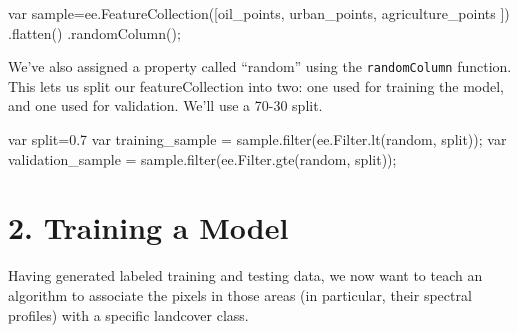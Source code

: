 \documentclass[
  letterpaper,
  DIV=11,
  numbers=noendperiod]{scrreprt}
\newenvironment{Shaded}{\begin{snugshade}}{\end{snugshade}}
\newcommand{\AttributeTok}[1]{\textcolor[rgb]{0.40,0.45,0.13}{#1}}
\newcommand{\FloatTok}[1]{\textcolor[rgb]{0.68,0.00,0.00}{#1}}
\newcommand{\FunctionTok}[1]{\textcolor[rgb]{0.28,0.35,0.67}{#1}}
\newcommand{\KeywordTok}[1]{\textcolor[rgb]{0.00,0.23,0.31}{#1}}
\newcommand{\NormalTok}[1]{\textcolor[rgb]{0.00,0.23,0.31}{#1}}
\newcommand{\OperatorTok}[1]{\textcolor[rgb]{0.37,0.37,0.37}{#1}}
\newcommand{\StringTok}[1]{\textcolor[rgb]{0.13,0.47,0.30}{#1}}
\begin{document}
\begin{Shaded}
\begin{Highlighting}[]
\KeywordTok{var}\NormalTok{ sample}\OperatorTok{=}\NormalTok{ee}\OperatorTok{.}\FunctionTok{FeatureCollection}\NormalTok{([oil\_points}\OperatorTok{,}
\NormalTok{                                  urban\_points}\OperatorTok{,}
\NormalTok{                                  agriculture\_points}
\NormalTok{                                  ])}
                                  \OperatorTok{.}\FunctionTok{flatten}\NormalTok{()}
                                  \OperatorTok{.}\FunctionTok{randomColumn}\NormalTok{()}\OperatorTok{;}
\end{Highlighting}
\end{Shaded}

We've also assigned a property called ``random'' using the
\texttt{randomColumn} function. This lets us split our featureCollection
into two: one used for training the model, and one used for validation.
We'll use a 70-30 split.

\begin{Shaded}
\begin{Highlighting}[]
\KeywordTok{var}\NormalTok{ split}\OperatorTok{=}\FloatTok{0.7}
\KeywordTok{var}\NormalTok{ training\_sample }\OperatorTok{=}\NormalTok{ sample}\OperatorTok{.}\FunctionTok{filter}\NormalTok{(ee}\OperatorTok{.}\AttributeTok{Filter}\OperatorTok{.}\FunctionTok{lt}\NormalTok{(}\StringTok{\textquotesingle{}random\textquotesingle{}}\OperatorTok{,}\NormalTok{ split))}\OperatorTok{;}
\KeywordTok{var}\NormalTok{ validation\_sample }\OperatorTok{=}\NormalTok{ sample}\OperatorTok{.}\FunctionTok{filter}\NormalTok{(ee}\OperatorTok{.}\AttributeTok{Filter}\OperatorTok{.}\FunctionTok{gte}\NormalTok{(}\StringTok{\textquotesingle{}random\textquotesingle{}}\OperatorTok{,}\NormalTok{ split))}\OperatorTok{;}
\end{Highlighting}
\end{Shaded}

\hypertarget{training-a-model}{%
\section*{2. Training a Model}\label{training-a-model}}


Having generated labeled training and testing data, we now want to teach
an algorithm to associate the pixels in those areas (in particular,
their spectral profiles) with a specific landcover class.
\end{document}
